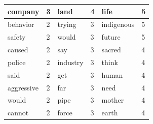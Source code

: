 \begin{footnotesize}
\begin{table}[H]
\begin{tabular}{|l|l|l|l|l|l|}
company                & 3                       & land                   & 4                       & life                   & 5                       \\ \hline
behavior               & 2                       & trying                 & 3                       & indigenous             & 5                       \\ \hline
safety                 & 2                       & would                  & 3                       & future                 & 5                       \\ \hline
caused                 & 2                       & say                    & 3                       & sacred                 & 4                       \\ \hline
police                 & 2                       & industry               & 3                       & think                  & 4                       \\ \hline
said                   & 2                       & get                    & 3                       & human                  & 4                       \\ \hline
aggressive             & 2                       & far                    & 3                       & need                   & 4                       \\ \hline
would                  & 2                       & pipe                   & 3                       & mother                 & 4                       \\ \hline
cannot                 & 2                       & force                  & 3                       & earth                  & 4                       \\ \hline
\end{tabular}
\end{table}


\end{footnotesize}


